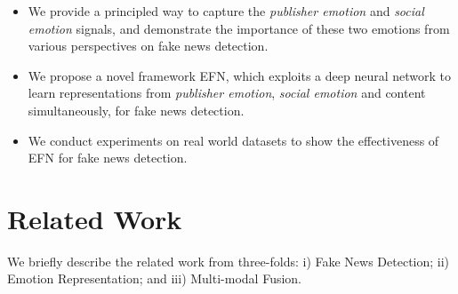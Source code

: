 \documentclass{article}
\newcommand{\m}{EFN}
\begin{document}
	
	\begin{itemize}
		
		\item We provide a principled way to capture the {\em publisher emotion} and {\em social emotion} signals, and demonstrate the importance of these two emotions from various perspectives on fake news detection.
		\item We propose a novel framework {\m}, which exploits a deep neural network to learn representations from {\em publisher emotion}, {\em social emotion} and content simultaneously, for fake news detection.
		\item We conduct experiments on real world datasets to show the effectiveness of {\m} for fake news detection. 
	\end{itemize}
	
	
	\section{Related Work}
	
	We briefly describe the related work from three-folds: i) Fake News Detection; ii) Emotion Representation; and iii) Multi-modal Fusion.
	
\end{document}
